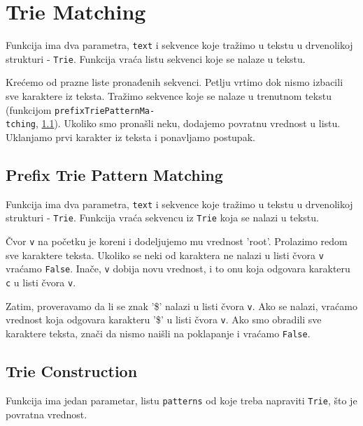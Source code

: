\section{Trie Matching}

Funkcija ima dva parametra, \texttt{text} i sekvence koje tražimo u tekstu u drvenolikoj strukturi - \texttt{Trie}. Funkcija vraća listu sekvenci koje se nalaze u tekstu.

Krećemo od prazne liste pronađenih sekvenci. Petlju vrtimo dok nismo izbacili sve karaktere iz teksta. Tražimo sekvence koje se nalaze u trenutnom tekstu (funkcijom \texttt{prefixTriePatternMa-\\tching}, \ref{prefixTrieMatching}). Ukoliko smo pronašli neku, dodajemo povratnu vrednost u listu. Uklanjamo prvi karakter iz teksta i ponavljamo postupak.




\subsection{Prefix Trie Pattern Matching}
\label{prefixTrieMatching}

Funkcija ima dva parametra, \texttt{text} i sekvence koje tražimo u tekstu u drvenolikoj strukturi - \texttt{Trie}. Funkcija vraća sekvencu iz \texttt{Trie} koja se nalazi u tekstu.

Čvor \texttt{v} na početku je koreni i dodeljujemo mu vrednost 'root'. Prolazimo redom sve karaktere teksta. Ukoliko se neki od karaktera ne nalazi u listi čvora \texttt{v} vraćamo \texttt{False}. Inače, \texttt{v} dobija novu vrednost, i to onu koja odgovara karakteru \texttt{c} u listi čvora \texttt{v}. 

Zatim, proveravamo da li se znak '\$' nalazi u listi čvora \texttt{v}. Ako se nalazi, vraćamo vrednost koja odgovara karakteru '\$' u listi čvora \texttt{v}. Ako smo obradili sve karaktere teksta, znači da nismo naišli na poklapanje i vraćamo \texttt{False}.




\subsection{Trie Construction}
\label{trieConstruction}

Funkcija ima jedan parametar, listu \texttt{patterns} od koje treba napraviti \texttt{Trie}, što je povratna vrednost.

